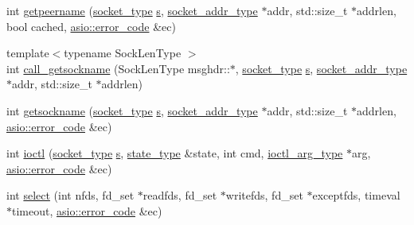 \begin{DoxyCompactItemize}
\item 
int \hyperlink{namespaceasio_1_1detail_1_1socket__ops_a7eb8e3b97dad917c5fe4d3664c0ecf8f}{getpeername} (\hyperlink{namespaceasio_1_1detail_a6798c771dd84b79798b1a08150706ea9}{socket\+\_\+type} \hyperlink{group__async__connect_ga31ab74b9ea6c77932dddd016cfc7920a}{s}, \hyperlink{namespaceasio_1_1detail_a40a7b0385a38f87815ffbb8df5e34d05}{socket\+\_\+addr\+\_\+type} $\ast$addr, std\+::size\+\_\+t $\ast$addrlen, bool cached, \hyperlink{classasio_1_1error__code}{asio\+::error\+\_\+code} \&ec)
\item 
{\footnotesize template$<$typename Sock\+Len\+Type $>$ }\\int \hyperlink{namespaceasio_1_1detail_1_1socket__ops_ae568252b745dce233ce0fbbdbc806f06}{call\+\_\+getsockname} (Sock\+Len\+Type msghdr\+::$\ast$, \hyperlink{namespaceasio_1_1detail_a6798c771dd84b79798b1a08150706ea9}{socket\+\_\+type} \hyperlink{group__async__connect_ga31ab74b9ea6c77932dddd016cfc7920a}{s}, \hyperlink{namespaceasio_1_1detail_a40a7b0385a38f87815ffbb8df5e34d05}{socket\+\_\+addr\+\_\+type} $\ast$addr, std\+::size\+\_\+t $\ast$addrlen)
\item 
int \hyperlink{namespaceasio_1_1detail_1_1socket__ops_aeec0ef9b889b4b3ba39fe6648043a597}{getsockname} (\hyperlink{namespaceasio_1_1detail_a6798c771dd84b79798b1a08150706ea9}{socket\+\_\+type} \hyperlink{group__async__connect_ga31ab74b9ea6c77932dddd016cfc7920a}{s}, \hyperlink{namespaceasio_1_1detail_a40a7b0385a38f87815ffbb8df5e34d05}{socket\+\_\+addr\+\_\+type} $\ast$addr, std\+::size\+\_\+t $\ast$addrlen, \hyperlink{classasio_1_1error__code}{asio\+::error\+\_\+code} \&ec)
\item 
int \hyperlink{namespaceasio_1_1detail_1_1socket__ops_ac3303fb771ae777eb12155ba979f05a4}{ioctl} (\hyperlink{namespaceasio_1_1detail_a6798c771dd84b79798b1a08150706ea9}{socket\+\_\+type} \hyperlink{group__async__connect_ga31ab74b9ea6c77932dddd016cfc7920a}{s}, \hyperlink{namespaceasio_1_1detail_1_1socket__ops_a5ce32ee297edef8833113ea35a933054}{state\+\_\+type} \&state, int cmd, \hyperlink{namespaceasio_1_1detail_a27f72e1b8b785eaaa59ddc6b41751106}{ioctl\+\_\+arg\+\_\+type} $\ast$arg, \hyperlink{classasio_1_1error__code}{asio\+::error\+\_\+code} \&ec)
\item 
int \hyperlink{namespaceasio_1_1detail_1_1socket__ops_a0a47a79366b24b2cf8cc7781f2ec82bc}{select} (int nfds, fd\+\_\+set $\ast$readfds, fd\+\_\+set $\ast$writefds, fd\+\_\+set $\ast$exceptfds, timeval $\ast$timeout, \hyperlink{classasio_1_1error__code}{asio\+::error\+\_\+code} \&ec)
\item 

\end{DoxyCompactItemize}
